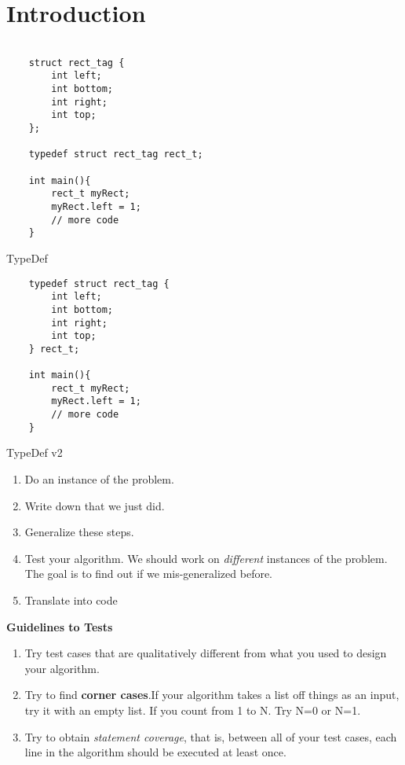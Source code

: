\documentclass[11pt, a4paper]{article}
\begin{document}
\section{Introduction}%
\label{sec:introduction}


\begin{listing}
\begin{verbatim}

    struct rect_tag {
    	int left;
    	int bottom;
    	int right;
    	int top;
    };
    
    typedef struct rect_tag rect_t;
    
    int main(){
    	rect_t myRect;
    	myRect.left = 1;
    	// more code
    }
\end{verbatim}
\caption{TypeDef}
\label{lst:TypeDef}
\end{listing}



\begin{listing}
\begin{verbatim}
    typedef struct rect_tag {
    	int left;
    	int bottom;
    	int right;
    	int top;
    } rect_t;
    
    int main(){
        rect_t myRect;
    	myRect.left = 1;
    	// more code
    }
\end{verbatim}
\caption{TypeDef v2}
\label{lst:typedef_v_2}
\end{listing}


\begin{enumerate}
	\item Do an instance of the problem.
	\item Write down that we just did.
	\item Generalize these steps.
	\item Test your algorithm. We should work on \textit{different} instances of the problem. The goal is to find out if we mis-generalized before. 
	\item Translate into code
\end{enumerate}

\textbf{Guidelines to Tests}

\begin{enumerate}
	\item Try test cases that are qualitatively different from what you used to design your algorithm. 
	\item Try to find \textbf{corner cases}.If your algorithm takes a list off things as an input, try it with an empty list. If you count from 1 to N. Try N=0 or N=1.
	\item Try to obtain \textit{statement coverage}, that is, between all of your test cases, each line in the algorithm should be executed at least once. 
\end{enumerate}
\end{document}
